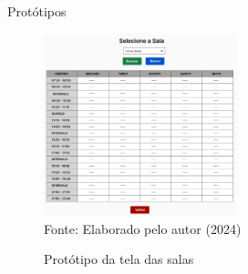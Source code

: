 \begin{frame}{Protótipos}
    \begin{figure}
        \centering
        \vspace{-0.5cm}
        \caption{Protótipo da tela das salas}
        \vspace{-0.2cm}
        \includegraphics[width=0.5\textwidth]{figuras/proto-5.png}
        \\ %
        \small Fonte: Elaborado pelo autor (2024)
    \end{figure}
\end{frame}

